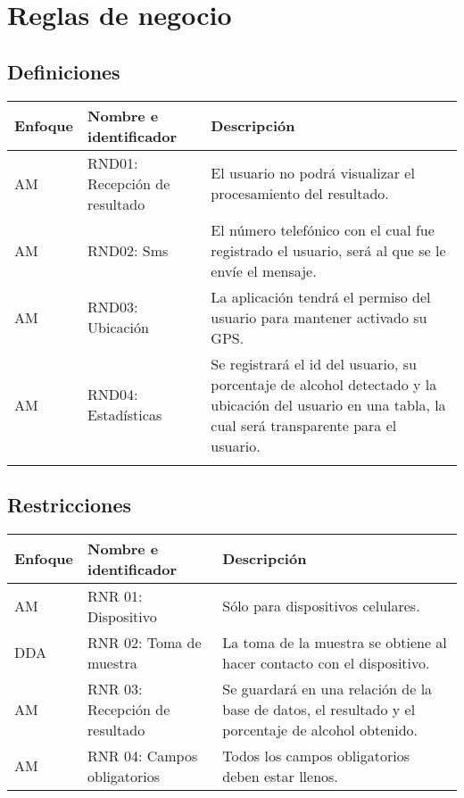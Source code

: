 \section{Reglas de negocio}
\subsection{Definiciones}
  \begin{center}
   \begin{tabular}{|p{1.5cm}|p{4cm}|p{7cm}|}
     \hline
       \textbf{Enfoque}&\textbf{Nombre e identificador} & \textbf{Descripción} \\ \hline
           AM & RND01: Recepción de resultado &  El usuario no podrá visualizar el procesamiento del resultado. \\ \hline
           AM & RND02: Sms &  El número telefónico con el cual fue registrado el usuario, será al que se le envíe el mensaje. \\ \hline
           AM & RND03: Ubicación &  La aplicación tendrá el permiso del usuario para mantener activado su GPS. \\ \hline
           AM & RND04: Estadísticas &  Se registrará el id del usuario, su porcentaje de alcohol detectado y la ubicación del usuario en una tabla, la cual será transparente para el usuario. \\ \\ \hline
   \end{tabular}
    \label{tab:rnd}
 \end{center}

\subsection{Restricciones}
  \begin{center}
   \begin{tabular}{|p{1.5cm}|p{4cm}|p{7cm}|}
     \hline
       \textbf{Enfoque}&\textbf{Nombre e identificador} & \textbf{Descripción} \\ \hline
           AM & RNR 01: Dispositivo &  Sólo para dispositivos celulares. \\ \hline
           DDA & RNR 02: Toma de muestra &  La toma de la muestra se obtiene al hacer contacto con el dispositivo. \\ \hline
           AM & RNR 03: Recepción de resultado &  Se guardará en una relación de la base de datos, el resultado y el porcentaje de alcohol
 obtenido. \\ \hline
         \label{rnr_04} AM & RNR 04: Campos obligatorios & Todos los campos obligatorios deben estar llenos. \\ \hline
   \end{tabular}
    \label{tab:rnr}
 \end{center}  

